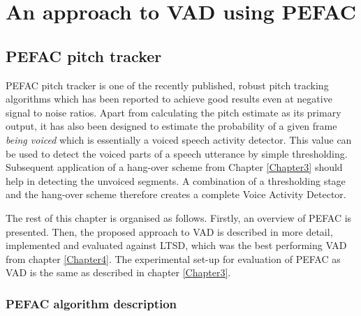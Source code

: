 
\chapter{An approach to VAD using PEFAC} %

\label{Chapter5} %



\section{PEFAC pitch tracker}

PEFAC pitch tracker \cite{PEFAC} is one of the recently published, robust pitch tracking algorithms which has been reported to achieve good results even at negative signal to noise ratios. Apart from calculating the pitch estimate as its primary output, it has also been designed to estimate the probability of a given frame \emph{being voiced} which is essentially a voiced speech activity detector. This value can be used to detect the voiced parts of a speech utterance by simple thresholding. Subsequent application of a hang-over scheme from Chapter \ref{Chapter3} should help in detecting the unvoiced segments. A combination of a thresholding stage and the hang-over scheme therefore creates a complete Voice Activity Detector.

The rest of this chapter is organised as follows. Firstly, an overview of PEFAC is presented. Then, the proposed approach to VAD is described in more detail, implemented and evaluated against LTSD, which was the best performing VAD from chapter \ref{Chapter4}. The experimental set-up for evaluation of PEFAC as VAD is the same as described in chapter \ref{Chapter3}.


\subsection{PEFAC algorithm description}

